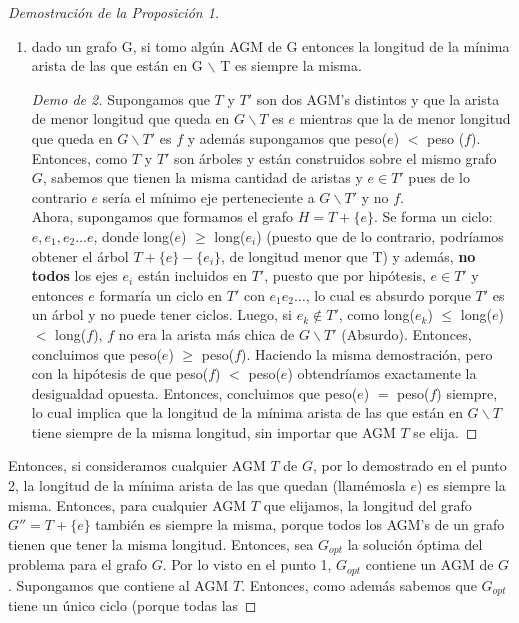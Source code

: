 \documentclass[11pt, a4paper, twoside]{article}
\begin{document}
\begin{proof}[Demostración de la Proposición 1]
\begin{enumerate}
  \item dado un grafo G, si tomo algún AGM de G entonces la longitud de la mínima 
        arista de las que están en G $\backslash$ T es siempre la misma.
        
        \begin{proof}[Demo de 2]
		Supongamos que $T$ y $T'$ son dos AGM's distintos y que la arista de menor longitud 
		que queda en $G \backslash T$ es $e$ mientras que la de menor longitud que queda en
		$G \backslash T'$ es $f$ y además supongamos que peso($e$) $<$ peso ($f$). Entonces,
		como $T$ y $T'$ son árboles y están construidos sobre el mismo grafo $G$, sabemos que
		tienen la misma cantidad de aristas y $e \in T'$ pues de lo contrario $e$ sería el mínimo
		eje perteneciente a $G \backslash T'$ y no $f$.\\
		Ahora, supongamos que formamos el grafo 
		$H = T + \{e\}$. Se forma un ciclo: $e, e_{1}, e_{2} \dots e$, donde long($e$) $\geq$ 
		long($e_{i}$) (puesto que de lo contrario, podríamos obtener el árbol $T + \{e\} - \{e_{i}\}$, de 
		longitud menor que T) y además, \textbf{no todos} 
		los ejes $e_{i}$ están incluidos en $T'$, puesto que por hipótesis, $e \in T'$ y entonces
		$e$ formaría un ciclo en $T'$ con $e_{1} e_{2} \dots$, lo cual es absurdo porque $T'$ es un
		árbol y no puede tener ciclos.
		Luego, si $e_{k} \not\in T'$, como long($e_{k}$) $\leq$ long($e$) $<$ long($f$), $f$ no 
		era la arista más chica de $G \backslash T'$ (Absurdo). Entonces, concluimos que 
		peso($e$) $\geq$ peso($f$). Haciendo la misma demostración, pero con la hipótesis de que
		peso($f$) $<$ peso($e$) obtendríamos exactamente la desigualdad opuesta. 
		Entonces, concluimos que peso($e$) $=$ peso($f$) siempre, lo cual implica que 
		la longitud de la mínima arista de las que están en $G \backslash T$ tiene siempre de
		la misma longitud, sin importar que AGM $T$ se elija.
		\end{proof}
\end{enumerate}
Entonces, si consideramos cualquier AGM $T$ de $G$, por lo demostrado en el punto 2, la
longitud de la mínima arista de las que quedan (llamémosla $e$) es siempre la misma.
Entonces, para cualquier AGM $T$ que elijamos, la longitud del grafo $ G'' = T + \{e\} $
también es siempre la misma, porque todos los AGM's de un grafo tienen que tener la misma
longitud. Entonces, sea $G_{opt}$ la solución óptima del problema para el grafo $G$. 
Por lo visto en el punto 1, $G_{opt}$ contiene un AGM de $G$. Supongamos que contiene 
al AGM $T$. Entonces, como además sabemos que $G_{opt}$ tiene un único ciclo (porque todas las 

\end{proof}
\end{document}
